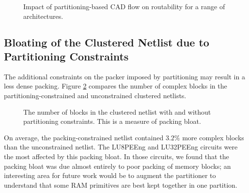 \begin{figure}[!htbp]
\centering

\caption{Impact of partitioning-based CAD flow on routability for a range of architectures.\protect\footnotemark}
\label{fig:wires_cut}
\end{figure}
\subsection{Bloating of the Clustered Netlist due to Partitioning Constraints}
The additional constraints on the packer imposed by partitioning may result in a less dense packing. Figure \ref{fig:packing_bloat} compares the number of complex blocks in the partitioning-constrained and unconstrained clustered netlists.

\begin{figure}[!htbp]
\centering

\caption{The number of blocks in the clustered netlist with and without partitioning constraints. This is a measure of packing bloat.}
\label{fig:packing_bloat}
\end{figure}

On average, the packing-constrained netlist contained $3.2\%$ more complex blocks than the unconstrained netlist. The LU8PEEng and LU32PEEng circuits were the most affected by this packing bloat. In those circuits, we found that the packing bloat was due almost entirely to poor packing of memory blocks; an interesting area for future work would be to augment the partitioner to understand that some RAM primitives are best kept together in one partition.
